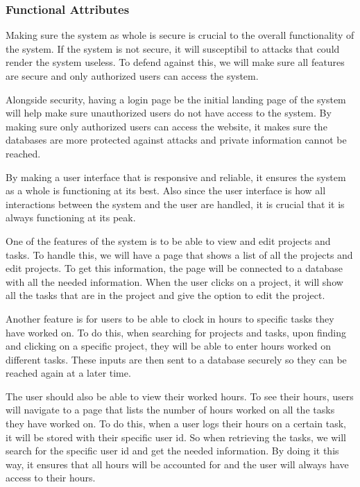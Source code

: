 \documentclass[letterpaper,10pt,titlepage,journal,compsoc,draftclsnofoot,onecolumn]{IEEEtran}
\begin{document}
\subsubsection{Functional Attributes}

Making sure the system as whole is secure is crucial to the overall functionality of the system. If the system is not secure, it will susceptibil to attacks that could render the system useless. To defend against this, we will make sure all features are secure and only authorized users can access the system.  


Alongside security, having a login page be the initial landing page of the system will help make sure unauthorized users do not have access to the system. By making sure only authorized users can access the website, it makes sure the databases are more protected against attacks and private information cannot be reached. 


By making a user interface that is responsive and reliable, it ensures the system as a whole is functioning at its best. Also since the user interface is how all interactions between the system and the user are handled, it is crucial that it is always functioning at its peak. 


One of the features of the system is to be able to view and edit projects and tasks. To handle this, we will have a page that shows a list of all the projects and edit projects. To get this information, the page will be connected to a database with all the needed information. When the user clicks on a project, it will show all the tasks that are in the project and give the option to edit the project. 


Another feature is for users to be able to clock in hours to specific tasks they have worked on. To do this, when searching for projects and tasks, upon finding and clicking on a specific project, they will be able to enter hours worked on different tasks. These inputs are then sent to a database securely so they can be reached again at a later time. 


The user should also be able to view their worked hours. To see their hours, users will navigate to a page that lists the number of hours worked on all the tasks they have worked on. To do this, when a user logs their hours on a certain task, it will be stored with their specific user id. So when retrieving the tasks, we will search for the specific user id and get the needed information. By doing it this way, it ensures that all hours will be accounted for and the user will always have access to their hours. 
\end{document}
